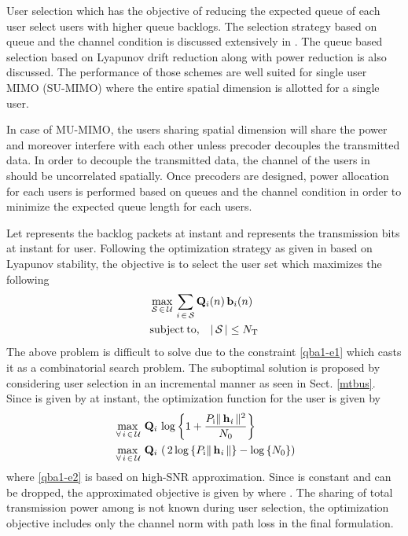 
User selection which has the objective of reducing the expected queue of each user select users with higher queue backlogs. The selection strategy based on queue and the channel condition is discussed extensively in \cite{neely2012stability}. The queue based selection based on Lyapunov drift reduction along with power reduction is also discussed. The performance of those schemes are well suited for single user MIMO (SU-MIMO) where the entire spatial dimension is allotted for a single user.

In case of MU-MIMO, the users sharing spatial dimension will share the power and moreover interfere with each other unless precoder decouples the transmitted data. In order to decouple the transmitted data, the channel of the users in  should be uncorrelated spatially. Once precoders are designed, power allocation for each users is performed based on queues and the channel condition in order to minimize the expected queue length for each users.

Let  represents the backlog packets at  instant and  represents the transmission bits at  instant for  user. Following the optimization strategy as given in \cite{neely2012stability} based on Lyapunov stability, the objective is to select the user set  which maximizes the following
\begin{eqnarray}
&\displaystyle \max_{\mathcal{S} \, \in \, \mathcal{U}} \, \sum_{i \, \in \, \mathcal{S}}\mathbf{Q}_i(n) \, \mathbf{b}_i(n) \\
&\displaystyle \mathrm{subject \: to,} \quad | \, \mathcal{S} \, | \leq N_{\mathrm{T}}
\label{qba1-e1}
\end{eqnarray}
The above problem is difficult to solve due to the constraint \eqref{qba1-e1} which casts it as a combinatorial search problem. The suboptimal solution is proposed by considering user selection in an incremental manner as seen in Sect. \ref{mtbus}. Since  is given by  at  instant, the optimization function for the user  is given by
\begin{eqnarray}
&\displaystyle \max_{\, \forall \, i \, \in \, \mathcal{U}} \, \mathbf{Q}_i \, \log \left \lbrace 1 + \frac{P_{\mathrm{i}}\|\, \mathbf{h}_{\mathit{i}} \,\|^2}{N_{\mathrm{0}}} \right \rbrace \\
&\displaystyle \max_{\, \forall \, i \, \in \, \mathcal{U}} \, \mathbf{Q}_i \, \left ( \, 2 \log \left \lbrace P_{\mathrm{i}}\|\, \mathbf{h}_{\mathit{i}} \,\| \right \rbrace - \log \left \lbrace N_{\mathrm{0}} \right \rbrace \right )
\label{qba1-e2}
\end{eqnarray}
where \eqref{qba1-e2} is based on high-SNR approximation. Since  is constant and can be dropped, the approximated objective is given by  where . The sharing of total transmission power among  is not known during user selection, the optimization objective includes only the channel norm with path loss in the final formulation.

